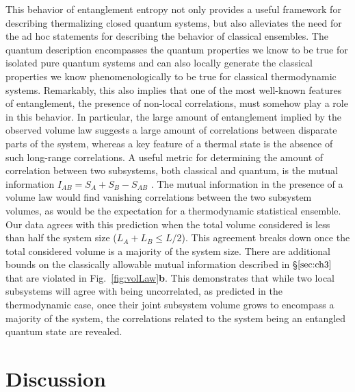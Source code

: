 This behavior of entanglement entropy not only provides a useful framework for describing thermalizing closed quantum systems, but also alleviates the need for the ad hoc statements for describing the behavior of classical ensembles. The quantum description encompasses the quantum properties we know to be true for isolated pure quantum systems and can also locally generate the classical properties we know phenomenologically to be true for classical thermodynamic systems. Remarkably, this also implies that one of the most well-known features of entanglement, the presence of non-local correlations, must somehow play a role in this behavior. In particular, the large amount of entanglement implied by the observed volume law suggests a large amount of correlations between disparate parts of the system, whereas a key feature of a thermal state is the absence of such long-range correlations. A useful metric for determining the amount of correlation between two subsystems, both classical and quantum, is the mutual information $I_{AB} = S_A + S_B - S_{AB}$ \cite{Wolf2008, Islam2015}. The mutual information in the presence of a volume law would find vanishing correlations between the two subsystem volumes, as would be the expectation for a thermodynamic statistical ensemble. Our data agrees with this prediction when the total volume considered is less than half the system size ($L_A+L_B\leq L/2$). This agreement breaks down once the total considered volume is a majority of the system size. There are additional bounds on the classically allowable mutual information described in \S $\ref{sec:ch3}$ that are violated in Fig.~\ref{fig:volLaw}\textbf{b}. This  demonstrates that while two local subsystems will agree with being uncorrelated, as predicted in the thermodynamic case, once their joint subsystem volume grows to encompass a majority of the system, the correlations related to the system being an entangled quantum state are revealed.

\section{Discussion}

